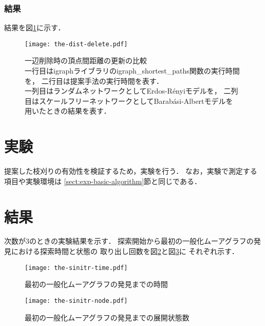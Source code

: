 \subsubsection*{結果}
結果を図\ref{fig:the-dist-delete}に示す．
\begin{figure}
  \centering
  \texttt{[image: the-dist-delete.pdf]}
  \caption{一辺削除時の頂点間距離の更新の比較 \\
      一行目はigraphライブラリのigraph\_shortest\_paths関数の実行時間を，
      二行目は提案手法の実行時間を表す．\\
      一列目はランダムネットワークとしてErdos-R{\'e}nyiモデルを，
      二列目はスケールフリーネットワークとしてBarab{\'a}si-Albertモデルを
      用いたときの結果を表す．}
  \label{fig:the-dist-delete}
\end{figure}

\section{実験}
\label{sect:exp-reduce-by-initial}
提案した枝刈りの有効性を検証するため，実験を行う．
なお，実験で測定する項目や実験環境は
\ref{sect:exp-basic-algorithm}節と同じである．

\section{結果}
次数が3のときの実験結果を示す．
探索開始から最初の一般化ムーアグラフの発見における探索時間と状態の
取り出し回数を図\ref{fig:sinitr-time}と図\ref{fig:sinitr-node}に
それぞれ示す．

\begin{figure}
  \centering
  \texttt{[image: the-sinitr-time.pdf]}
  \caption{最初の一般化ムーアグラフの発見までの時間}
  \label{fig:sinitr-time}
\end{figure}
\begin{figure}
  \centering
  \texttt{[image: the-sinitr-node.pdf]}
  \caption{最初の一般化ムーアグラフの発見までの展開状態数}
  \label{fig:sinitr-node}
\end{figure}
